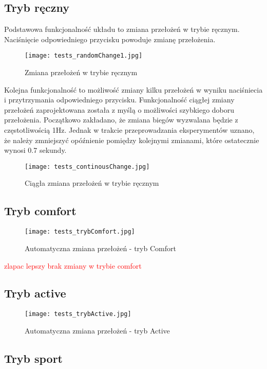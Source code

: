 \subsection{Tryb ręczny}
Podstawowa funkcjonalność układu to zmiana przełożeń w trybie ręcznym. Naciśnięcie odpowiedniego przycisku powoduje zmianę przełożenia.
 
\begin{figure}[h]
    \centering
    \texttt{[image: tests\_randomChange1.jpg]}
    \caption{Zmiana przełożeń w trybie ręcznym}
    \label{fig:tests_randomChange}
\end{figure}

Kolejna funkcjonalność to możliwość zmiany kilku przełożeń w wyniku naciśniecia i przytrzymania odpowiedniego przycisku. Funkcjonalność ciągłej zmiany przełożeń zaprojektowana została z myślą o możliwości szybkiego doboru przełożenia. Początkowo zakładano, że zmiana biegów wyzwalana będzie z częstotliwością 1Hz. Jednak w trakcie przeprowadzania eksperymentów uznano, że należy zmniejszyć opóźnienie pomiędzy kolejnymi zmianami, które ostatecznie wynosi 0.7 sekundy.

\begin{figure}[h]
    \centering
    \texttt{[image: tests\_continousChange.jpg]}
    \caption{Ciągła zmiana przełożeń w trybie ręcznym}
    \label{fig:tests_continousChange}
\end{figure}
\subsection{Tryb comfort}

\begin{figure}[h]
    \centering
    \texttt{[image: tests\_trybComfort.jpg]}
    \caption{Automatyczna zmiana przełożeń - tryb Comfort}
    \label{fig:tests_continousChange}
\end{figure}
\textcolor{red}{zlapac lepszy brak zmiany w trybie comfort}
\subsection{Tryb active}
\begin{figure}[h]
    \centering
    \texttt{[image: tests\_trybActive.jpg]}
    \caption{Automatyczna zmiana przełożeń - tryb Active}
    \label{fig:tests_continousChange}
\end{figure}
\subsection{Tryb sport}
